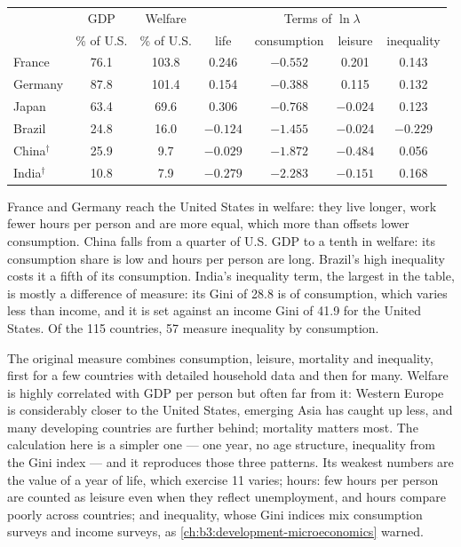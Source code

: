 \begin{center}
\begin{tabular}{lcccccc}
  & GDP & Welfare & \multicolumn{4}{c}{Terms of $\ln\lambda$} \\
  & \% of U.S. & \% of U.S. & life & consumption & leisure & inequality \\ \hline
  France & 76.1 & 103.8 & 0.246 & $-0.552$ & 0.201 & 0.143 \\
  Germany & 87.8 & 101.4 & 0.154 & $-0.388$ & 0.115 & 0.132 \\
  Japan & 63.4 & 69.6 & 0.306 & $-0.768$ & $-0.024$ & 0.123 \\
  Brazil & 24.8 & 16.0 & $-0.124$ & $-1.455$ & $-0.024$ & $-0.229$ \\
  China$^\dagger$ & 25.9 & 9.7 & $-0.029$ & $-1.872$ & $-0.484$ & 0.056 \\
  India$^\dagger$ & 10.8 & 7.9 & $-0.279$ & $-2.283$ & $-0.151$ & 0.168 \\ \hline
\end{tabular}

\end{center}

France and Germany reach the United States in welfare: they live longer, work fewer
hours per person and are more equal, which more than offsets lower consumption. China
falls from a quarter of U.S. GDP to a tenth in welfare: its consumption share is low
and hours per person are long. Brazil's high inequality costs it a fifth of its consumption.
India's inequality term, the largest in the table, is mostly a difference of measure:
its Gini of 28.8 is of consumption, which varies less than income, and it is set
against an income Gini of 41.9 for the United States. Of the 115 countries, 57 measure
inequality by consumption. %

\begin{measure}
The original measure combines consumption, leisure, mortality and inequality, first
for a few countries with detailed household data and then for many. Welfare is highly
correlated with GDP per person but often far from it: Western Europe is considerably
closer to the United States, emerging Asia has caught up less, and many developing
countries are further behind; mortality matters most. %
The calculation here is a simpler one --- one year, no age structure, inequality from
the Gini index --- and it reproduces those three patterns. Its weakest numbers are the
value of a year of life, which exercise 11 varies; hours: few hours per person are
counted as leisure even when they reflect unemployment, and hours compare poorly
across countries; and inequality, whose Gini indices mix consumption surveys and
income surveys, as \cref{ch:b3:development-microeconomics} warned.
\end{measure}

